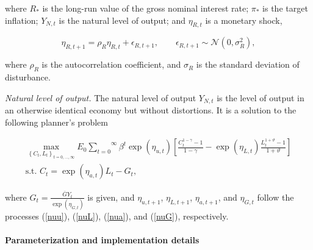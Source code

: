 where $R_{\ast }$ is the long-run value of the gross nominal interest rate; $
\pi _{\ast }$ is the target inflation; $Y_{N,t}$ is the natural level of
output; and $\eta _{R,t}$ is a monetary shock,

\begin{equation}
\eta _{R,t+1}=\rho _{R}\eta _{R,t}+\epsilon _{R,t+1},\qquad \epsilon
_{R,t+1}\sim \mathcal{N}\left( 0,\sigma _{R}^{2}\right) ,  \label{nuR}
\end{equation}

where $\rho _{R}$ is the autocorrelation coefficient, and $\sigma _{R}$ is the
standard deviation of disturbance.

\textit{Natural level of output. }The natural level of output $Y_{N,t}$ is the
level of output in an otherwise identical economy but without distortions. It
is a solution to the following planner's problem

\begin{gather}
\underset{\left \{ C_{t},L_{t}\right \} _{t=0,...,\infty }}{\max }E_{0}
\overset{\infty }{\underset{t=0}{\sum }}\beta ^{t}\exp \left( \eta
_{u,t}\right) \left[ \frac{C_{t}^{1-\gamma }-1}{1-\gamma }-\exp \left( \eta
_{L,t}\right) \frac{L_{t}^{1+\vartheta }-1}{1+\vartheta }\right]  \label{Pob}
\\
\text{s.t. }C_{t}=\exp \left( \eta _{a,t}\right) L_{t}-G_{t},  \label{Pbc}
\end{gather}

where $G_{t}=\frac{\overline{G}Y_{t}}{\exp \left( \eta _{G,t}\right) }$ is
given, and $\eta _{u,t+1}$, $\eta _{L,t+1}$, $\eta _{a,t+1}$, and $\eta _{G,t}$
follow the processes (\ref{nuu}), (\ref{nuL}), (\ref{nua}), and (\ref {nuG}),
respectively.

\paragraph{Parameterization and implementation details}

